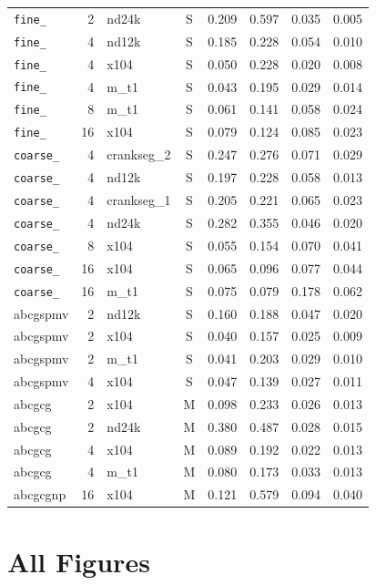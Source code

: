 \documentclass[11pt]{article}
\begin{document}
\begin{longtable}{@{}lrlcrrrr@{}}
\texttt{fine\_} & 2 & nd24k & S & 0.209 & 0.597 & 0.035 & 0.005 \\
\texttt{fine\_} & 4 & nd12k & S & 0.185 & 0.228 & 0.054 & 0.010 \\
\texttt{fine\_} & 4 & x104 & S & 0.050 & 0.228 & 0.020 & 0.008 \\
\texttt{fine\_} & 4 & m\_t1 & S & 0.043 & 0.195 & 0.029 & 0.014 \\
\texttt{fine\_} & 8 & m\_t1 & S & 0.061 & 0.141 & 0.058 & 0.024 \\
\texttt{fine\_} & 16 & x104 & S & 0.079 & 0.124 & 0.085 & 0.023 \\
\texttt{coarse\_} & 4 & crankseg\_2 & S & 0.247 & 0.276 & 0.071 & 0.029 \\
\texttt{coarse\_} & 4 & nd12k & S & 0.197 & 0.228 & 0.058 & 0.013 \\
\texttt{coarse\_} & 4 & crankseg\_1 & S & 0.205 & 0.221 & 0.065 & 0.023 \\
\texttt{coarse\_} & 4 & nd24k & S & 0.282 & 0.355 & 0.046 & 0.020 \\
\texttt{coarse\_} & 8 & x104 & S & 0.055 & 0.154 & 0.070 & 0.041 \\
\texttt{coarse\_} & 16 & x104 & S & 0.065 & 0.096 & 0.077 & 0.044 \\
\texttt{coarse\_} & 16 & m\_t1 & S & 0.075 & 0.079 & 0.178 & 0.062 \\
abcgspmv & 2 & nd12k & S & 0.160 & 0.188 & 0.047 & 0.020 \\
abcgspmv & 2 & x104 & S & 0.040 & 0.157 & 0.025 & 0.009 \\
abcgspmv & 2 & m\_t1 & S & 0.041 & 0.203 & 0.029 & 0.010 \\
abcgspmv & 4 & x104 & S & 0.047 & 0.139 & 0.027 & 0.011 \\
abcgcg & 2 & x104 & M & 0.098 & 0.233 & 0.026 & 0.013 \\
abcgcg & 2 & nd24k & M & 0.380 & 0.487 & 0.028 & 0.015 \\
abcgcg & 4 & x104 & M & 0.089 & 0.192 & 0.022 & 0.013 \\
abcgcg & 4 & m\_t1 & M & 0.080 & 0.173 & 0.033 & 0.013 \\
abcgcgnp & 16 & x104 & M & 0.121 & 0.579 & 0.094 & 0.040 \\
\bottomrule
\end{longtable}
\normalsize

\FloatBarrier
\section{All Figures}
\label{app:figures}
\end{document}
